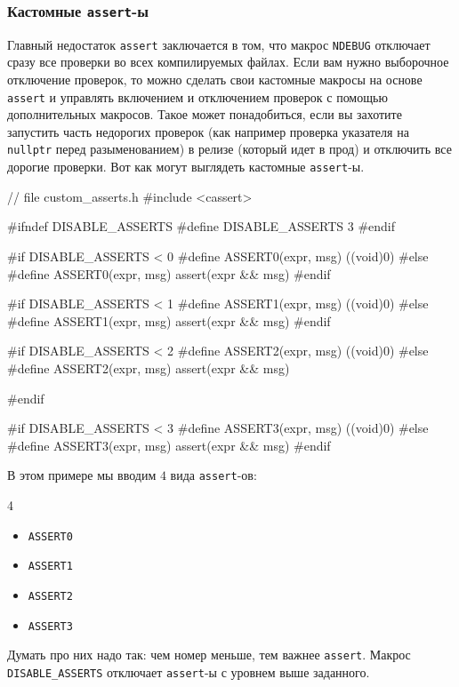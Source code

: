 \subsubsection{Кастомные \texttt{assert}-ы}
\label{section::CustomAsserts}

Главный недостаток \verb"assert" заключается в том, что макрос \verb"NDEBUG" отключает сразу все проверки во всех компилируемых файлах.
Если вам нужно выборочное отключение проверок, то можно сделать свои кастомные макросы на основе \verb"assert" и управлять включением и отключением проверок с помощью дополнительных макросов.
Такое может понадобиться, если вы захотите запустить часть недорогих проверок (как например проверка указателя на \verb"nullptr" перед разыменованием) в релизе (который идет в прод) и отключить все дорогие проверки.
Вот как могут выглядеть кастомные \verb"assert"-ы.
\begin{cppcode}
// file custom_asserts.h
#include <cassert>

#ifndef DISABLE_ASSERTS
#define DISABLE_ASSERTS 3
#endif

#if DISABLE_ASSERTS < 0
#define ASSERT0(expr, msg) ((void)0)
#else
#define ASSERT0(expr, msg) assert(expr && msg)
#endif

#if DISABLE_ASSERTS < 1
#define ASSERT1(expr, msg) ((void)0)
#else
#define ASSERT1(expr, msg) assert(expr && msg)
#endif

#if DISABLE_ASSERTS < 2
#define ASSERT2(expr, msg) ((void)0)
#else
#define ASSERT2(expr, msg) assert(expr && msg)

#endif

#if DISABLE_ASSERTS < 3
#define ASSERT3(expr, msg) ((void)0)
#else
#define ASSERT3(expr, msg) assert(expr && msg)
#endif
\end{cppcode}
В этом примере мы вводим $4$ вида \verb"assert"-ов:
\begin{multicols}{4}
\begin{itemize}
\item \verb"ASSERT0"

\item \verb"ASSERT1"

\item \verb"ASSERT2"

\item \verb"ASSERT3"
\end{itemize}
\end{multicols}
Думать про них надо так: чем номер меньше, тем важнее \verb"assert".
Макрос \verb"DISABLE_ASSERTS" отключает \verb"assert"-ы с уровнем выше заданного.
